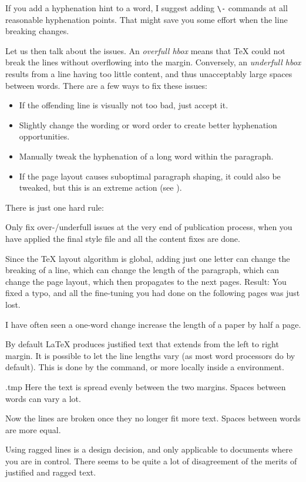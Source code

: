\begin{practices}
If you add a hyphenation hint to a word,
I suggest adding \verb|\-| commands at all reasonable hyphenation points.
That might save you some effort when the line breaking changes.
\end{practices}


Let us then talk about the issues.
An \emph{overfull hbox} means that \TeX{} could not break the lines
without overflowing into the margin.
Conversely, an \emph{underfull hbox} results from a line having too little content,
and thus unacceptably large spaces between words.
There are a few ways to fix these issues:

\begin{itemize}
    \item If the offending line is visually not too bad, just accept it.
    \item Slightly change the wording or word order to create better hyphenation opportunities.
    \item Manually tweak the hyphenation of a long word within the paragraph.
    \item If the page layout causes suboptimal paragraph shaping,
        it could also be tweaked, but this is an extreme action (see ).
\end{itemize}
%
There is just one hard rule:

\begin{warning}
Only fix over-/underfull issues at the very end of publication process,
when you have applied the final style file
and all the content fixes are done.

Since the \TeX{} layout algorithm is global,
adding just one letter can change the breaking of a line,
which can change the length of the paragraph,
which can change the page layout,
which then propagates to the next pages.
Result: You fixed a typo, and all the fine-tuning you had done on the following pages was just lost.

I have often seen a one-word change increase the length of a paper by half a page.
\end{warning}

By default \LaTeX{} produces justified text that extends from the left to right margin.
It is possible to let the line lengths vary (as most word processors do by default).
This is done by the  command,
or more locally inside a  environment.
%
\begin{VerbatimOut}{\jobname.tmp}
Here the text is spread evenly
between the two margins.
Spaces between words can vary a lot.\\

\raggedright

Now the lines are broken
once they no longer fit more text.
Spaces between words are more equal.
\end{VerbatimOut}
\ShowExample
%
Using ragged lines is a design decision,
and only applicable to documents where you are in control.
There seems to be quite a lot of disagreement of the merits of justified and ragged text.

